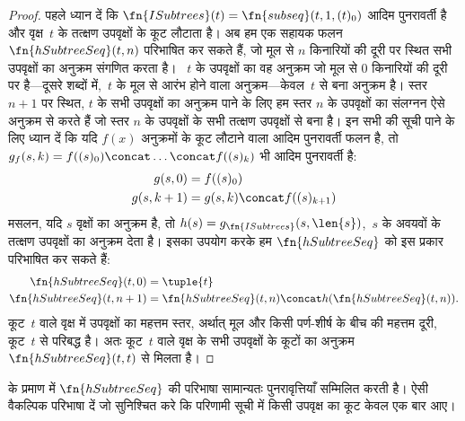 \documentclass[../../../include/open-logic-section]{subfiles}
\begin{document}
\begin{proof}
  पहले ध्यान दें कि $\fn{ISubtrees}(t) = \fn{subseq}(t, 1, (t)_0)$
  आदिम पुनरावर्ती है और वृक्ष~$t$ के तत्क्षण उपवृक्षों के कूट लौटाता है।
  अब हम एक सहायक फलन $\fn{hSubtreeSeq}(t,n)$ परिभाषित कर सकते हैं, जो
  मूल से $n$ किनारियों की दूरी पर स्थित सभी उपवृक्षों का अनुक्रम संगणित करता है।
  ~$t$ के उपवृक्षों का वह अनुक्रम जो मूल से $0$ किनारियों की दूरी पर है---दूसरे शब्दों
  में,~$t$ के मूल से आरंभ होने वाला अनुक्रम---केवल~$t$ से बना अनुक्रम
  है। स्तर~$n+1$ पर स्थित, $t$ के सभी उपवृक्षों का अनुक्रम पाने के लिए हम स्तर
  $n$ के उपवृक्षों का संलग्नन ऐसे अनुक्रम से करते हैं जो स्तर $n$ के
  उपवृक्षों के सभी तत्क्षण उपवृक्षों से बना है। इन सभी की सूची पाने के
  लिए ध्यान दें कि यदि $f(x)$ अनुक्रमों के कूट लौटाने वाला आदिम
  पुनरावर्ती फलन है, तो $g_f(s, k) = f((s)_0) \concat
  \dots \concat f((s)_k)$ भी आदिम पुनरावर्ती है:
    \begin{align*}
      g(s, 0) & = f((s)_0)\\
      g(s, k+1) & = g(s, k) \concat f((s)_{k+1})
    \end{align*}
    मसलन, यदि $s$ वृक्षों का अनुक्रम है, तो
    $h(s) = g_{\fn{ISubtrees}}(s, \len{s})$,~$s$ के अवयवों के तत्क्षण
    उपवृक्षों का अनुक्रम देता है। इसका उपयोग करके हम
    $\fn{hSubtreeSeq}$ को इस प्रकार परिभाषित कर सकते हैं:
    \begin{align*}
      \fn{hSubtreeSeq}(t, 0) & = \tuple{t} \\
      \fn{hSubtreeSeq}(t, n+1) & = \fn{hSubtreeSeq}(t, n) \concat
      h(\fn{hSubtreeSeq}(t, n)).
    \end{align*}
    कूट~$t$ वाले वृक्ष में उपवृक्षों का महत्तम स्तर, अर्थात् मूल और किसी
    पर्ण-शीर्ष के बीच की महत्तम दूरी, कूट~$t$ से परिबद्ध है। अतः कूट~$t$
    वाले वृक्ष के सभी उपवृक्षों के कूटों का अनुक्रम
    $\fn{hSubtreeSeq}(t, t)$ से मिलता है।
\end{proof}

\begin{prob}
   के प्रमाण में
  $\fn{hSubtreeSeq}$ की परिभाषा सामान्यतः पुनरावृत्तियाँ सम्मिलित करती
  है। ऐसी वैकल्पिक परिभाषा दें जो सुनिश्चित करे कि परिणामी सूची में किसी
  उपवृक्ष का कूट केवल एक बार आए।
\end{prob}
\end{document}
